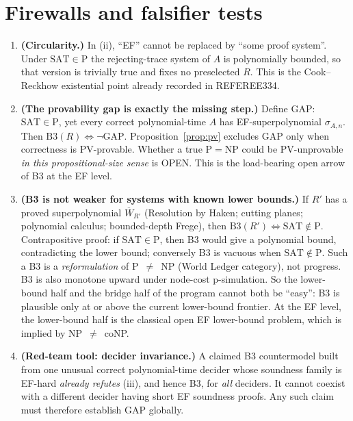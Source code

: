 \documentclass[11pt]{article}
\newcommand{\SAT}{\mathrm{SAT}}
\newcommand{\Wbar}{\overline W}
\begin{document}
\section{Firewalls and falsifier tests}
\begin{enumerate}
\item[\textbf{FW1}] \textbf{(Circularity.)} In (ii), ``EF'' cannot be replaced by
``some proof system''. Under $\SAT\in\mathrm P$ the rejecting-trace system of $A$
is polynomially bounded, so that version is trivially true and fixes no
preselected $R$. This is the Cook--Reckhow existential point already recorded in
REFEREE334.
\item[\textbf{FW2}] \textbf{(The provability gap is exactly the missing step.)}
Define $\mathrm{GAP}$: $\SAT\in\mathrm P$, yet every correct polynomial-time $A$
has EF-superpolynomial $\sigma_{A,n}$. Then $\mathrm{B3}(R)\iff\neg\mathrm{GAP}$.
Proposition~\ref{prop:pv} excludes GAP only when correctness is PV-provable.
Whether a true $\mathrm P=\mathrm{NP}$ could be PV-unprovable \emph{in this
propositional-size sense} is OPEN. This is the load-bearing open arrow of B3 at
the EF level.
\item[\textbf{FW3}] \textbf{(B3 is not weaker for systems with known lower bounds.)}
If $R'$ has a proved superpolynomial $\Wbar_{R'}$ (Resolution by Haken; cutting
planes; polynomial calculus; bounded-depth Frege), then
$\mathrm{B3}(R')\iff\SAT\notin\mathrm P$. Contrapositive proof: if
$\SAT\in\mathrm P$, then B3 would give a polynomial bound, contradicting the
lower bound; conversely B3 is vacuous when $\SAT\notin\mathrm P$. Such a B3 is a
\emph{reformulation} of P~$\neq$~NP (World Ledger category), not progress.
B3 is also monotone upward under node-cost p-simulation. So the
lower-bound half and the bridge half of the program cannot both be ``easy'':
B3 is plausible only at or above the current lower-bound frontier. At the EF
level, the lower-bound half is the classical open EF lower-bound problem, which
is implied by NP~$\neq$~coNP.
\item[\textbf{FW4}] \textbf{(Red-team tool: decider invariance.)} A claimed B3
countermodel built from one unusual correct polynomial-time decider whose
soundness family is EF-hard \emph{already refutes} (iii), and hence B3, for
\emph{all} deciders. It cannot coexist with a different decider having short
EF soundness proofs. Any such claim must therefore establish GAP globally.
\end{enumerate}
\end{document}
